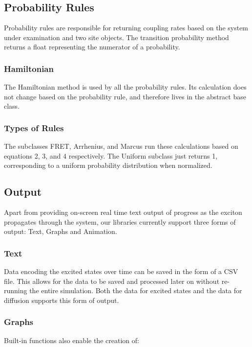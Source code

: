 \documentclass{article}
\begin{document}
\subsection{Probability Rules}

Probability rules are responsible for returning coupling rates based on the system under examination and two site objects. The transition probability method returns a float representing the numerator of a probability. 



\subsubsection{Hamiltonian}

The Hamiltonian method is used by all the probability rules. Its calculation does not change based on the probability rule, and therefore lives in the abstract base class.



\subsubsection{Types of Rules}

The subclasses FRET, Arrhenius, and Marcus run these calculations based on equations 2, 3, and 4 respectively. The Uniform subclass just returns 1, corresponding to a uniform probability distribution when normalized.


\subsection{Output}
Apart from providing on-screen real time text output of progress as the exciton propagates through the system, our libraries currently support three forms of output: Text, Graphs and Animation.

\subsubsection{Text}
Data encoding the excited states over time can be saved in the form of a CSV file. This allows for the data to be saved and processed later on without re-running the entire simulation. Both the data for excited states and the data for diffusion supports this form of output.
\subsubsection{Graphs}
Built-in functions also enable the creation of:
\end{document}
